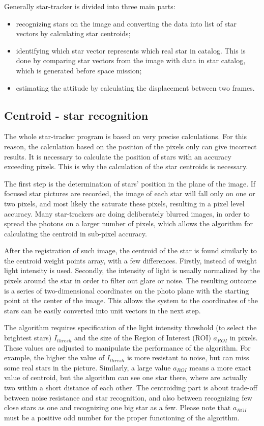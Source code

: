 \documentclass[12pt,a4paper,twoside]{article}
\begin{document}
Generally star-tracker is divided into three main parts\cite{mcbryde2012star}:
\begin{itemize}
\item recognizing stars on the image and converting the data into list of star vectors by calculating star centroids;
\item identifying which star vector represents which real star in catalog. This is done by comparing star vectors from the image with data in star catalog, which is generated before space mission;
\item estimating the attitude by calculating the displacement between two frames.
\end{itemize}

\subsection{Centroid - star recognition}

The whole star-tracker program is based on very precise calculations. For this reason, the calculation based on the position of the pixels only can give incorrect results. It is necessary to calculate the position of stars with an accuracy exceeding pixels. This is why the calculation of the star centroids is necessary.

The first step is the determination of stars' position in the plane of the image. If focused star pictures are recorded, the image of each star will fall only on one or two pixels, and most likely the saturate these pixels, resulting in a pixel level accuracy.
Many star-trackers are doing deliberately blurred images, in order to spread the photons on a larger number of pixels, which allows the algorithm for calculating the centroid in sub-pixel accuracy.

After the registration of such image, the centroid of the star is found similarly to the centroid weight points array, with a few differences. Firstly, instead of weight light intensity is used. Secondly, the intensity of light is usually normalized by the pixels around the star in order to filter out glare or noise. The resulting outcome is a series of two-dimensional coordinates on the photo plane with the starting point at the center of the image. This allows the system to the coordinates of the stars can be easily converted into unit vectors in the next step.

The algorithm requires specification of the light intensity threshold (to select the brightest stars) $I_{thresh}$ and the size of the Region of Interest (ROI) $a_{ROI}$ in pixels. These values are adjusted to manipulate the performance of the algorithm. For example, the higher the value of $I_{thresh}$ is more resistant to noise, but can miss some real stars in the picture. Similarly, a large value $a_{ROI}$ means a more exact value of centroid, but the algorithm can see one star there, where are actually two within a short distance of each other. The centroiding part is about trade-off between noise resistance and star recognition, and also between recognizing few close stars as one and recognizing one big star as a few.
Please note that $a_{ROI}$ must be a positive odd number for the proper functioning of the algorithm.
\end{document}
